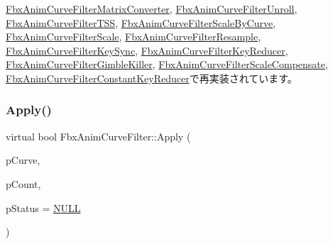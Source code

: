 \hyperlink{class_fbx_anim_curve_filter_matrix_converter_aa71462534eff53b1177aaa5bb3e059ec}{Fbx\+Anim\+Curve\+Filter\+Matrix\+Converter}, \hyperlink{class_fbx_anim_curve_filter_unroll_a11788f2b59b218d566603fcf3e68cd50}{Fbx\+Anim\+Curve\+Filter\+Unroll}, \hyperlink{class_fbx_anim_curve_filter_t_s_s_a9d6e08d720db38d5d795c3993298ada2}{Fbx\+Anim\+Curve\+Filter\+T\+SS}, \hyperlink{class_fbx_anim_curve_filter_scale_by_curve_ac27bdff4d17273d2a767d188436e53f8}{Fbx\+Anim\+Curve\+Filter\+Scale\+By\+Curve}, \hyperlink{class_fbx_anim_curve_filter_scale_abec5cc73d37bef6e8ab3127ed09b21a3}{Fbx\+Anim\+Curve\+Filter\+Scale}, \hyperlink{class_fbx_anim_curve_filter_resample_a1359f91c344c6dd4d89fa0a883ae38b2}{Fbx\+Anim\+Curve\+Filter\+Resample}, \hyperlink{class_fbx_anim_curve_filter_key_sync_ad85aff7b0cd6b4ce563002b6d52c0041}{Fbx\+Anim\+Curve\+Filter\+Key\+Sync}, \hyperlink{class_fbx_anim_curve_filter_key_reducer_a1f3a0f984cf30eb74d9ae260ef9ae252}{Fbx\+Anim\+Curve\+Filter\+Key\+Reducer}, \hyperlink{class_fbx_anim_curve_filter_gimble_killer_adb147695af2818ccc71e245170d05e78}{Fbx\+Anim\+Curve\+Filter\+Gimble\+Killer}, \hyperlink{class_fbx_anim_curve_filter_scale_compensate_a1e2bc6474043beb0b41a85b2d70fde76}{Fbx\+Anim\+Curve\+Filter\+Scale\+Compensate}, \hyperlink{class_fbx_anim_curve_filter_constant_key_reducer_a54f43929707bc95bc5d0830ec039fde2}{Fbx\+Anim\+Curve\+Filter\+Constant\+Key\+Reducer}で再実装されています。

\mbox{\label{class_fbx_anim_curve_filter_aca6a41fbc4d9019b20df7adccfa6ed3c}} 
\subsubsection{\texorpdfstring{Apply()}{Apply()}\hspace{0.1cm}{\footnotesize\ttfamily [4/5]}}
{\footnotesize\ttfamily virtual bool Fbx\+Anim\+Curve\+Filter\+::\+Apply (\begin{DoxyParamCaption}\item[{\hyperlink{class_fbx_anim_curve}{Fbx\+Anim\+Curve} $\ast$$\ast$}]{p\+Curve,  }\item[{int}]{p\+Count,  }\item[{\hyperlink{class_fbx_status}{Fbx\+Status} $\ast$}]{p\+Status = {\ttfamily \hyperlink{fbxarch_8h_a070d2ce7b6bb7e5c05602aa8c308d0c4}{N\+U\+LL}} }\end{DoxyParamCaption})\hspace{0.3cm}{\ttfamily [virtual]}}

